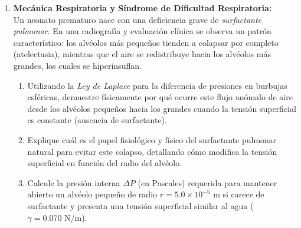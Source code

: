 \documentclass[10pt,letterpaper]{article}
\begin{document}
\begin{enumerate}[leftmargin=*]
    \item \textbf{Mecánica Respiratoria y Síndrome de Dificultad Respiratoria:}\\
    Un neonato prematuro nace con una deficiencia grave de \textit{surfactante pulmonar}. En una radiografía y evaluación clínica se observa un patrón característico: los alvéolos más pequeños tienden a colapsar por completo (atelectasia), mientras que el aire se redistribuye hacia los alvéolos más grandes, los cuales se hiperinsuflan.
    \begin{enumerate}
        \item Utilizando la \textit{Ley de Laplace} para la diferencia de presiones en burbujas esféricas, demuestre físicamente por qué ocurre este flujo anómalo de aire desde los alvéolos pequeños hacia los grandes cuando la tensión superficial es constante (ausencia de surfactante).
        \item Explique cuál es el papel fisiológico y físico del surfactante pulmonar natural para evitar este colapso, detallando cómo modifica la tensión superficial en función del radio del alvéolo.
        \item Calcule la presión interna $\Delta P$ (en Pascales) requerida para mantener abierto un alvéolo pequeño de radio $r = 5.0 \times 10^{-5} \text{ m}$ si carece de surfactante y presenta una tensión superficial similar al agua ($\gamma = 0.070 \text{ N/m}$).
    \end{enumerate}

    \vspace{0.1cm}


\end{enumerate}
\end{document}
